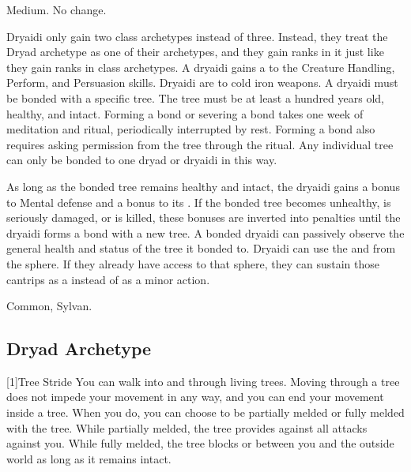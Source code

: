    Medium.
   No change.
  \begin{itemize}
     Dryaidi only gain two class archetypes instead of three.
      Instead, they treat the Dryad archetype as one of their archetypes, and they gain ranks in it just like they gain ranks in class archetypes.
     A dryaidi gains a   to the Creature Handling, Perform, and Persuasion skills.
     Dryaidi are \vulnerable to cold iron weapons.
     A dryaidi must be bonded with a specific tree.
      The tree must be at least a hundred years old, healthy, and intact.
      Forming a bond or severing a bond takes one week of meditation and ritual, periodically interrupted by rest.
      Forming a bond also requires asking permission from the tree through the ritual.
      Any individual tree can only be bonded to one dryad or dryaidi in this way.

      As long as the bonded tree remains healthy and intact, the dryaidi gains a  bonus to Mental defense and a  bonus to its .
      If the bonded tree becomes unhealthy, is seriously damaged, or is killed, these bonuses are inverted into penalties until the dryaidi forms a bond with a new tree.
      A bonded dryaidi can passively observe the general health and status of the tree it bonded to.
     Dryaidi can use the  and   from the  sphere.
      If they already have access to that sphere, they can sustain those cantrips as a  instead of as a minor action.
  \end{itemize}
   Common, Sylvan.

  \subsection{Dryad Archetype}

    [1]{Tree Stride} You can walk into and through living trees.
      Moving through a tree does not impede your movement in any way, and you can end your movement inside a tree.
      When you do, you can choose to be partially melded or fully melded with the tree.
      While partially melded, the tree provides  against all attacks against you.
      While fully melded, the tree blocks  or  between you and the outside world as long as it remains intact.

